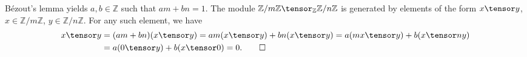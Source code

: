 Bézout's lemma yields $a, b \in \mathbb{Z}$ such that $am + bn = 1$. The
module $\mathbb{Z}/m\mathbb{Z} \tensor_\mathbb{Z} \mathbb{Z}/n\mathbb{Z}$ is generated
by elements of the form $x\tensor y$, $x \in \mathbb{Z}/m\mathbb{Z}$, $y \in\mathbb{Z}/n\mathbb{Z}$.
For any such element, we have
\begin{align*}
	 x\tensor y &= (am+bn)(x\tensor y) = am(x\tensor y) + bn(x\tensor y) = a(mx\tensor y) + b(x\tensor ny) \\
	&= a(0\tensor y) + b(x\tensor 0) = 0.\qedhere
\end{align*}
